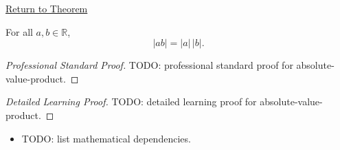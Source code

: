 \newpage
{}
\label{prf:absolute-value-product}

\begin{remark*}[Return]
\hyperref[thm:absolute-value-product]{Return to Theorem}
\end{remark*}

\begin{theorem*}
For all $a, b \in \mathbb{R}$,
\[
  \lvert ab \rvert = \lvert a \rvert\,\lvert b \rvert.
\]
\end{theorem*}

\begin{proof}[Professional Standard Proof]
\LRAProofBodyStart
TODO: professional standard proof for absolute-value-product.
\end{proof}

\begin{proof}[Detailed Learning Proof]
\LRAProofBodyStart
TODO: detailed learning proof for absolute-value-product.
\end{proof}

\begin{remark*}
\end{remark*}

\begin{dependencies}
\begin{itemize}
  \item TODO: list mathematical dependencies.
\end{itemize}
\end{dependencies}

\clearpage
